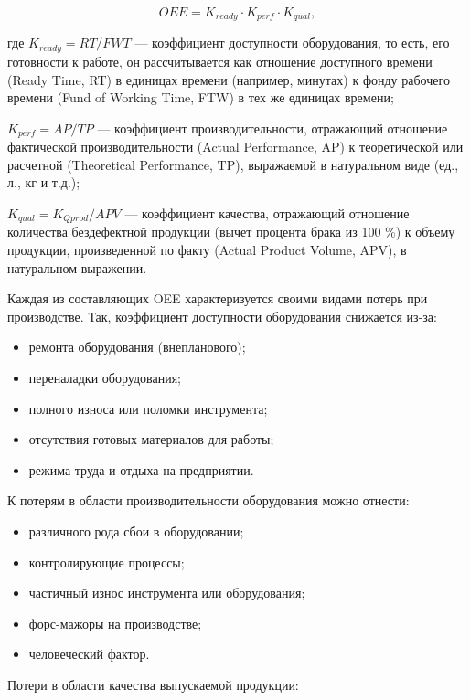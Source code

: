 \begin{equation}
OEE = K_{ready} \cdot K_{perf} \cdot K_{qual},
\label{eq_2_1}
\end{equation}

где $K_{ready} = RT / FWT$ --- коэффициент доступности оборудования, то есть, его готовности к работе, он рассчитывается как отношение доступного времени (Ready Time, RT) в единицах времени (например, минутах) к фонду рабочего времени (Fund of Working Time, FTW) в тех же единицах времени; 

$K_{perf} = AP / TP$ --- коэффициент производительности, отражающий отношение фактической производительности (Actual Performance, AP) к теоретической или расчетной (Theoretical Performance, TP), выражаемой в натуральном виде (ед., л., кг и т.д.); 

$K_{qual} = K_{Qprod} / APV$ --- коэффициент качества, отражающий отношение количества бездефектной продукции (вычет процента брака из 100 \%) к объему продукции, произведенной по факту (Actual Product Volume, APV), в натуральном выражении.

Каждая из составляющих OEE характеризуется своими видами потерь при производстве. Так, коэффициент доступности оборудования снижается из-за:

\begin{itemize}
	\item ремонта оборудования (внепланового);
	\item переналадки оборудования;
	\item полного износа или поломки инструмента;
	\item отсутствия готовых материалов для работы;
	\item режима труда и отдыха на предприятии.
\end{itemize}

К потерям в области производительности оборудования можно отнести:

\begin{itemize}
	\item различного рода сбои в оборудовании;
	\item контролирующие процессы;
	\item частичный износ инструмента или оборудования;
	\item форс-мажоры на производстве;
	\item человеческий фактор.
\end{itemize}

Потери в области качества выпускаемой продукции:

